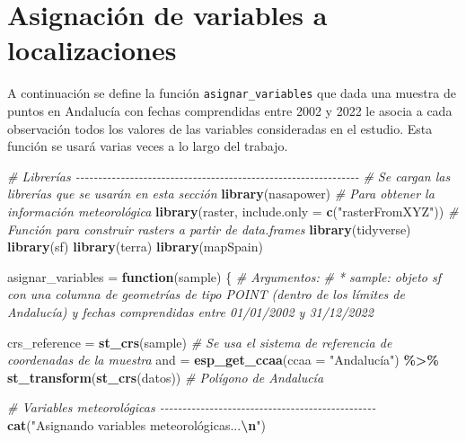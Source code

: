 \documentclass[12pt,a4paper,]{book}
\newenvironment{Shaded}{\begin{snugshade}}{\end{snugshade}}
\newcommand{\AttributeTok}[1]{\textcolor[rgb]{0.13,0.29,0.53}{#1}}
\newcommand{\CommentTok}[1]{\textcolor[rgb]{0.56,0.35,0.01}{\textit{#1}}}
\newcommand{\ControlFlowTok}[1]{\textcolor[rgb]{0.13,0.29,0.53}{\textbf{#1}}}
\newcommand{\FunctionTok}[1]{\textcolor[rgb]{0.13,0.29,0.53}{\textbf{#1}}}
\newcommand{\NormalTok}[1]{#1}
\newcommand{\OtherTok}[1]{\textcolor[rgb]{0.56,0.35,0.01}{#1}}
\newcommand{\SpecialCharTok}[1]{\textcolor[rgb]{0.81,0.36,0.00}{\textbf{#1}}}
\newcommand{\StringTok}[1]{\textcolor[rgb]{0.31,0.60,0.02}{#1}}
\numberwithin{dummy}{section}
\theoremstyle{ocrenumbox}
\theoremstyle{blacknumex}
\theoremstyle{blacknumbox}
\theoremstyle{ocrenum}
\theoremstyle{ocrenum}
\begin{document}
\hypertarget{asignaciuxf3n-de-variables-a-localizaciones}{%
\section{Asignación de variables a
localizaciones}\label{asignaciuxf3n-de-variables-a-localizaciones}}

A continuación se define la función \texttt{asignar\_variables} que dada
una muestra de puntos en Andalucía con fechas comprendidas entre 2002 y
2022 le asocia a cada observación todos los valores de las variables
consideradas en el estudio. Esta función se usará varias veces a lo
largo del trabajo.

\begin{Shaded}
\begin{Highlighting}[]
\CommentTok{\# Librerías {-}{-}{-}{-}{-}{-}{-}{-}{-}{-}{-}{-}{-}{-}{-}{-}{-}{-}{-}{-}{-}{-}{-}{-}{-}{-}{-}{-}{-}{-}{-}{-}{-}{-}{-}{-}{-}{-}{-}{-}{-}{-}{-}{-}{-}{-}{-}{-}{-}{-}{-}{-}{-}{-}{-}{-}{-}{-}{-}{-}{-}{-}{-}}
\CommentTok{\# Se cargan las librerías que se usarán en esta sección}
\FunctionTok{library}\NormalTok{(nasapower) }\CommentTok{\# Para obtener la información meteorológica}
\FunctionTok{library}\NormalTok{(raster, }\AttributeTok{include.only =} \FunctionTok{c}\NormalTok{(}\StringTok{"rasterFromXYZ"}\NormalTok{))  }\CommentTok{\# Función para construir rasters a partir de data.frames}
\FunctionTok{library}\NormalTok{(tidyverse) }
\FunctionTok{library}\NormalTok{(sf)}
\FunctionTok{library}\NormalTok{(terra)}
\FunctionTok{library}\NormalTok{(mapSpain)}

\NormalTok{asignar\_variables }\OtherTok{=} \ControlFlowTok{function}\NormalTok{(sample) \{}
  \CommentTok{\# Argumentos:}
  \CommentTok{\# * sample: objeto sf con una columna de geometrías de tipo POINT (dentro de los límites de Andalucía) y fechas comprendidas entre 01/01/2002 y 31/12/2022 }

  
\NormalTok{  crs\_reference }\OtherTok{=} \FunctionTok{st\_crs}\NormalTok{(sample) }\CommentTok{\# Se usa el sistema de referencia de coordenadas de la muestra}
\NormalTok{  and }\OtherTok{=} \FunctionTok{esp\_get\_ccaa}\NormalTok{(}\AttributeTok{ccaa =} \StringTok{"Andalucía"}\NormalTok{) }\SpecialCharTok{\%\textgreater{}\%} \FunctionTok{st\_transform}\NormalTok{(}\FunctionTok{st\_crs}\NormalTok{(datos)) }\CommentTok{\# Polígono de Andalucía}
  
  \CommentTok{\# Variables meteorológicas {-}{-}{-}{-}{-}{-}{-}{-}{-}{-}{-}{-}{-}{-}{-}{-}{-}{-}{-}{-}{-}{-}{-}{-}{-}{-}{-}{-}{-}{-}{-}{-}{-}{-}{-}{-}{-}{-}{-}{-}{-}{-}{-}{-}{-}{-}{-}{-}}
  \FunctionTok{cat}\NormalTok{(}\StringTok{"Asignando variables meteorológicas...}\SpecialCharTok{\textbackslash{}n}\StringTok{"}\NormalTok{)}
  

\end{Highlighting}
\end{Shaded}
\end{document}
